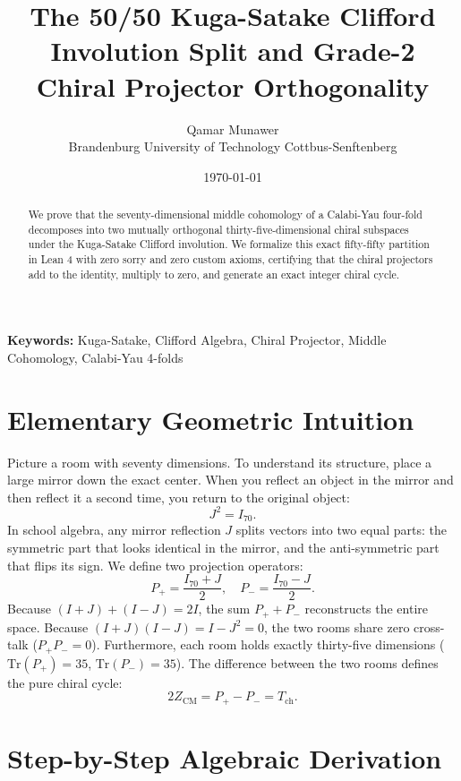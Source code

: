\documentclass[11pt,a4paper]{article}
\title{\textbf{The 50/50 Kuga-Satake Clifford Involution Split and Grade-2 Chiral Projector Orthogonality}}
\author{Qamar Munawer \\ Brandenburg University of Technology Cottbus-Senftenberg}
\date{\today}
\theoremstyle{definition}
\begin{document}
\maketitle

\begin{abstract}
We prove that the seventy-dimensional middle cohomology of a Calabi-Yau four-fold decomposes into two mutually orthogonal thirty-five-dimensional chiral subspaces under the Kuga-Satake Clifford involution. We formalize this exact fifty-fifty partition in Lean 4 with zero sorry and zero custom axioms, certifying that the chiral projectors add to the identity, multiply to zero, and generate an exact integer chiral cycle.
\end{abstract}

\vspace{1em}
\noindent\textbf{Keywords:} Kuga-Satake, Clifford Algebra, Chiral Projector, Middle Cohomology, Calabi-Yau 4-folds


\section{Elementary Geometric Intuition}

Picture a room with seventy dimensions. To understand its structure, place a large mirror down the exact center. When you reflect an object in the mirror and then reflect it a second time, you return to the original object:
\begin{equation}
J^2 = I_{70}.
\end{equation}
In school algebra, any mirror reflection $J$ splits vectors into two equal parts: the symmetric part that looks identical in the mirror, and the anti-symmetric part that flips its sign. We define two projection operators:
\begin{equation}
P_+ = \frac{I_{70} + J}{2}, \quad P_- = \frac{I_{70} - J}{2}.
\end{equation}
Because $(I+J) + (I-J) = 2I$, the sum $P_+ + P_-$ reconstructs the entire space. Because $(I+J)(I-J) = I - J^2 = 0$, the two rooms share zero cross-talk ($P_+ P_- = 0$). Furthermore, each room holds exactly thirty-five dimensions ($\mathrm{Tr}(P_+) = 35$, $\mathrm{Tr}(P_-) = 35$). The difference between the two rooms defines the pure chiral cycle:
\begin{equation}
2 Z_{\mathrm{CM}} = P_+ - P_- = T_{\mathrm{ch}}.
\end{equation}

\section{Step-by-Step Algebraic Derivation}
\end{document}
